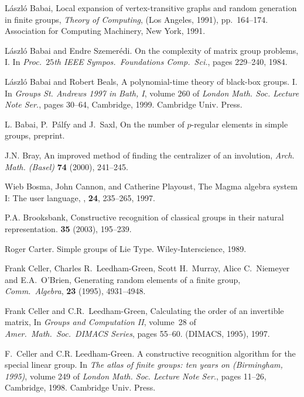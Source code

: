 \documentclass[12pt]{article}
\begin{document}
\begin{thebibliography}{10}

L\'aszl\'o Babai,  
Local expansion of vertex-transitive graphs and
  random generation in finite groups,  {\it Theory of Computing}, (Los
  Angeles, 1991), pp.\ 164--174. Association for Computing Machinery, 
New York, 1991.

L\'aszl\'o Babai and Endre Szemer\'edi.
\newblock On the complexity of matrix group problems, {I}.
\newblock In {\em Proc.\ $25$th IEEE Sympos.\ Foundations Comp.\ Sci.}, pages
  229--240, 1984.

L\'aszl\'o Babai and Robert Beals,
\newblock A polynomial-time theory of black-box groups. {I}.
\newblock In {\em Groups St. Andrews 1997 in Bath, I}, volume 260 of {\em
  London Math. Soc. Lecture Note Ser.}, pages 30--64, Cambridge, 1999.
  Cambridge Univ. Press.

 L. Babai, P.\ P{\'a}lfy and J.\ Saxl, On the number
of $p$-regular elements in simple groups, preprint.

 J.N. Bray, An improved method of finding
the centralizer of an involution, {\it Arch. Math. (Basel)}
{\bf 74} (2000), 241--245.

Wieb Bosma, John Cannon, and Catherine Playoust,
\newblock The {\sc Magma} algebra system I: The user language,
, {\bf 24}, 235--265, 1997.

P.A. Brooksbank,
\newblock Constructive recognition of classical groups
in their natural representation.
 {\bf 35} (2003), 195--239.


Roger Carter.
\newblock Simple groups of Lie Type.
\newblock Wiley-Interscience, 1989.

Frank Celler, Charles R.\ Leedham-Green, Scott H.\ Murray, Alice C.\
  Niemeyer and E.A.\ O'Brien, Generating random elements of a 
finite group, {\it Comm.\ Algebra}, {\bf 23} (1995), 4931--4948.

Frank Celler and C.R.\ Leedham-Green,
\newblock Calculating the order of an invertible matrix,
\newblock In {\em {Groups and Computation {II}}}, volume~28 of {\em Amer.\
  Math.\ Soc.\ DIMACS Series}, pages 55--60. (DIMACS, 1995), 1997.


F.~Celler and C.R. Leedham-Green.
\newblock A constructive recognition algorithm for the special linear group.
\newblock In {\em The atlas of finite groups: ten years on (Birmingham, 1995)},
  volume 249 of {\em London Math. Soc. Lecture Note Ser.}, pages 11--26,
  Cambridge, 1998. Cambridge Univ. Press.


\end{thebibliography}
\end{document}
